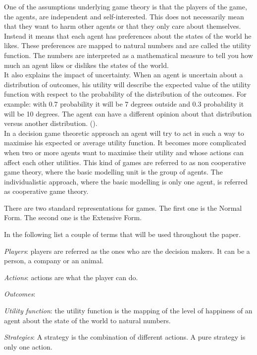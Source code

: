 One of the assumptions underlying game theory is that the players of the game, the agents, are independent and self-interested. This does not necessarily mean that they want to harm other agents or that they only care about themselves. 
Instead it means that each agent has preferences about the states of the world he likes. These preferences are mapped to natural numbers and are called the utility function. The numbers are interpreted as a mathematical measure to tell you how much an agent likes or dislikes the states of the world. \\
It also explains the impact of uncertainty. When an agent is uncertain about a distribution of outcomes, his utility will describe the expected value of the utility function with respect to the probability of the distribution of the outcomes. For example: with 0.7 probability it will be 7 degrees outside and 0.3 probability it will be 10 degrees. The agent can have a different opinion about that distribution versus another distribution. ().\\
In a decision game theoretic approach an agent will try to act in such a way to maximise his expected or average utility function. It becomes more complicated when two or more agents want to maximise their utility and whose actions can affect each other utilities. This kind of games are referred to as non cooperative game theory, where the basic modelling unit is the group of agents. The individualistic approach, where the basic modelling is only one agent, is referred as cooperative game theory. 

There are two standard representations for games. The first one is the Normal Form. The second one is the Extensive Form.

In the following list a couple of terms that will be used throughout the paper.
\begin{description}
\item \textit{Players}: players are referred as the ones who are the decision makers. It can be a person, a company or an animal.
\item \textit{Actions}: actions are what the player can do. 
\item \textit{Outcomes}:  
\item \textit{Utility function}: the utility function is the mapping of the level of happiness of an agent about the state of the world to natural numbers.
\item \textit{Strategies}: A strategy is the combination of different actions. A pure strategy is only one action.
\end{description}

